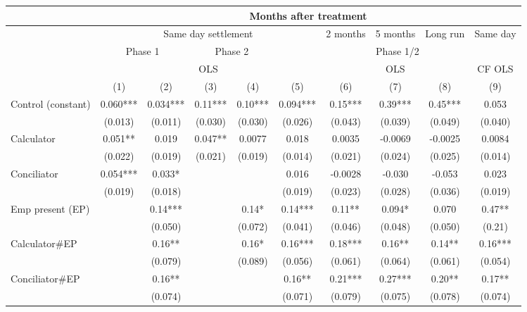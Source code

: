 \begin{tabular}{lccccccccc}
\toprule
\multicolumn{1}{|r}{} & \multicolumn{9}{c}{Months after treatment} \\
\midrule
\multicolumn{1}{r|}{} & \multicolumn{5}{c|}{Same day settlement} & \multicolumn{1}{c|}{2 months } & \multicolumn{1}{c|}{ 5 months} & \multicolumn{1}{c|}{Long run} & Same day  \\
\midrule
\midrule
\multicolumn{1}{r|}{} & \multicolumn{2}{c|}{Phase 1} & \multicolumn{2}{c|}{Phase 2} & \multicolumn{5}{c}{Phase 1/2} \\
\midrule
\multicolumn{1}{r|}{} & \multicolumn{5}{c|}{OLS}              & \multicolumn{3}{c|}{OLS} & CF OLS \\
\midrule
\midrule
      & (1)   & (2)   & (3)   & (4)   & (5)   & (6)   & (7)   & (8)   & (9) \\
\midrule
\midrule
Control (constant) & 0.060*** & 0.034*** & 0.11*** & 0.10*** & 0.094*** & 0.15*** & 0.39*** & 0.45*** & 0.053 \\
      & (0.013) & (0.011) & (0.030) & (0.030) & (0.026) & (0.043) & (0.039) & (0.049) & (0.040) \\
Calculator & 0.051** & 0.019 & 0.047** & 0.0077 & 0.018 & 0.0035 & -0.0069 & -0.0025 & 0.0084 \\
      & (0.022) & (0.019) & (0.021) & (0.019) & (0.014) & (0.021) & (0.024) & (0.025) & (0.014) \\
Conciliator & 0.054*** & 0.033* &       &       & 0.016 & -0.0028 & -0.030 & -0.053 & 0.023 \\
      & (0.019) & (0.018) &       &       & (0.019) & (0.023) & (0.028) & (0.036) & (0.019) \\
Emp present (EP) &       & 0.14*** &       & 0.14* & 0.14*** & 0.11** & 0.094* & 0.070 & 0.47** \\
      &       & (0.050) &       & (0.072) & (0.041) & (0.046) & (0.048) & (0.050) & (0.21) \\
Calculator\#EP &       & 0.16** &       & 0.16* & 0.16*** & 0.18*** & 0.16** & 0.14** & 0.16*** \\
      &       & (0.079) &       & (0.089) & (0.056) & (0.061) & (0.064) & (0.061) & (0.054) \\
Conciliator\#EP &       & 0.16** &       &       & 0.16** & 0.21*** & 0.27*** & 0.20** & 0.17** \\
      &       & (0.074) &       &       & (0.071) & (0.079) & (0.075) & (0.078) & (0.074) \\

\end{tabular}
